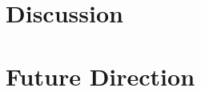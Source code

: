 \documentclass[phd,bottom,nosig]{usbthesis}
\begin{document}
\chapter{Discussion}\label{chap:discussion}

\chapter{Future Direction}\label{chap:future}




%


%



%
%



\end{document}

